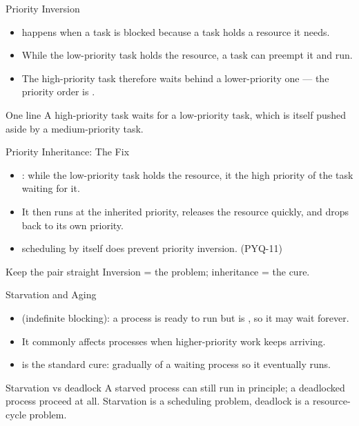 \documentclass[aspectratio=169]{beamer}
\begin{document}
\begin{frame}{Priority Inversion}
  \begin{itemize}
    \item {} happens when a  task is
      blocked because a  task holds a resource it needs.
    \item While the low-priority task holds the resource, a
       task can preempt it and run.
    \item The high-priority task therefore waits behind a lower-priority one
      --- the priority order is .
  \end{itemize}
  \begin{block}{One line}
    A high-priority task waits for a low-priority task, which is itself pushed
    aside by a medium-priority task.
  \end{block}
\end{frame}

\begin{frame}{Priority Inheritance: The Fix}
  \begin{itemize}
    \item {}: while the low-priority task holds the
      resource, it  the high priority of the task
      waiting for it.
    \item It then runs at the inherited priority, releases the resource
      quickly, and drops back to its own priority.
    \item {} scheduling by itself does  prevent
      priority inversion. (PYQ-11)
  \end{itemize}
  \begin{block}{Keep the pair straight}
    Inversion = the problem; inheritance = the cure.
  \end{block}
\end{frame}

\begin{frame}{Starvation and Aging}
  \begin{itemize}
    \item {} (indefinite blocking): a process is ready to run
      but is , so it may wait forever.
    \item It commonly affects  processes when
      higher-priority work keeps arriving.
    \item {} is the standard cure: gradually 
      of a waiting process so it eventually runs.
  \end{itemize}
  \begin{alertblock}{Starvation vs deadlock}
    A starved process can still run in principle; a deadlocked process
     proceed at all. Starvation is a scheduling problem, deadlock
    is a resource-cycle problem.
  \end{alertblock}
\end{frame}
\end{document}
